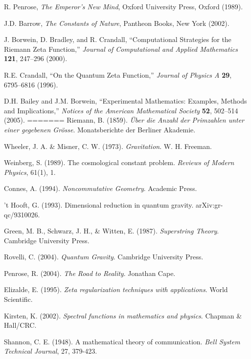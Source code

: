 \documentclass[12pt,a4paper]{article}
\begin{document}
\begin{thebibliography}{99}
 R. Penrose, \emph{The Emperor's New Mind}, Oxford University Press, Oxford (1989).

 J.D. Barrow, \emph{The Constants of Nature}, Pantheon Books, New York (2002).

 J. Borwein, D. Bradley, and R. Crandall, ``Computational Strategies for the Riemann Zeta Function,'' \emph{Journal of Computational and Applied Mathematics} \textbf{121}, 247--296 (2000).

 R.E. Crandall, ``On the Quantum Zeta Function,'' \emph{Journal of Physics A} \textbf{29}, 6795--6816 (1996).

 D.H. Bailey and J.M. Borwein, ``Experimental Mathematics: Examples, Methods and Implications,'' \emph{Notices of the American Mathematical Society} \textbf{52}, 502--514 (2005).
=======
Riemann, B. (1859).
\textit{Über die Anzahl der Primzahlen unter einer gegebenen Grösse}.
Monatsberichte der Berliner Akademie.

Wheeler, J. A. \& Misner, C. W. (1973).
\textit{Gravitation}.
W. H. Freeman.

Weinberg, S. (1989).
The cosmological constant problem.
\textit{Reviews of Modern Physics}, 61(1), 1.

Connes, A. (1994).
\textit{Noncommutative Geometry}.
Academic Press.

't Hooft, G. (1993).
Dimensional reduction in quantum gravity.
arXiv:gr-qc/9310026.

Green, M. B., Schwarz, J. H., \& Witten, E. (1987).
\textit{Superstring Theory}.
Cambridge University Press.

Rovelli, C. (2004).
\textit{Quantum Gravity}.
Cambridge University Press.

Penrose, R. (2004).
\textit{The Road to Reality}.
Jonathan Cape.

Elizalde, E. (1995).
\textit{Zeta regularization techniques with applications}.
World Scientific.

Kirsten, K. (2002).
\textit{Spectral functions in mathematics and physics}.
Chapman \& Hall/CRC.

Shannon, C. E. (1948).
A mathematical theory of communication.
\textit{Bell System Technical Journal}, 27, 379-423.


\end{thebibliography}
\end{document}
